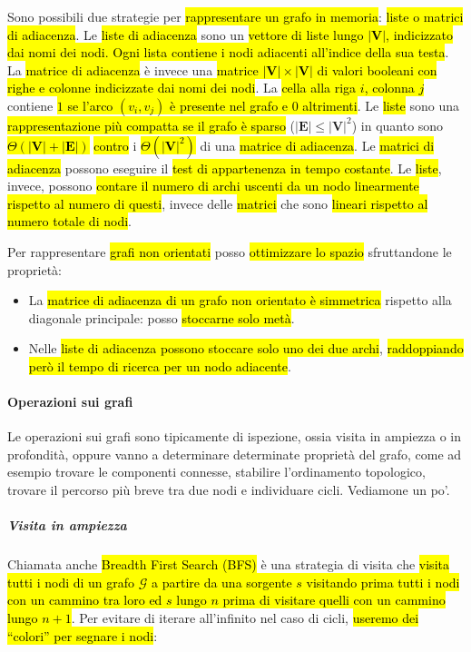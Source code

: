 \documentclass[a4paper,11pt,twoside]{article}
\theoremstyle{plain}
\theoremstyle{definition}
\theoremstyle{remark}
\begin{document}
Sono possibili due strategie per \hl{rappresentare un grafo in memoria}:
\hl{liste o matrici di adiacenza}. Le \hl{liste di adiacenza} sono un
\hl{vettore di liste lungo $|\mathbf{V}|$, indicizzato dai nomi dei nodi. Ogni
lista contiene i nodi adiacenti all'indice della sua testa}. La \hl{matrice di
adiacenza} è invece una \hl{matrice $|\mathbf{V}| \times |\mathbf{V}|$ di valori
booleani con righe e colonne indicizzate dai nomi dei nodi}. La \hl{cella alla
riga $i$, colonna $j$} contiene \hl{$1$ se l'arco $(v_i, v_j)$ è presente nel
grafo e $0$ altrimenti}. Le \hl{liste} sono una \hl{rappresentazione più
compatta se il grafo è sparso} ($|\mathbf{E}| \leq {|\mathbf{V}|}^2$) in quanto
sono \hl{$\Theta(|\mathbf{V}| + |\mathbf{E}|)$} \hl{contro} i
\hl{$\Theta({|\mathbf{V}|}^2)$} di una \hl{matrice di adiacenza}. Le \hl{matrici
di adiacenza} possono eseguire il \hl{test di appartenenza in tempo costante}.
Le \hl{liste}, invece, possono \hl{contare il numero di archi uscenti da un nodo
linearmente rispetto al numero di questi}, invece delle \hl{matrici} che sono
\hl{lineari rispetto al numero totale di nodi}.

Per rappresentare \hl{grafi non orientati} posso \hl{ottimizzare lo spazio}
sfruttandone le proprietà:

\begin{itemize}
  \item La \hl{matrice di adiacenza di un grafo non orientato è simmetrica}
    rispetto alla diagonale principale: posso \hl{stoccarne solo metà}.
  \item Nelle \hl{liste di adiacenza possono stoccare solo uno dei due archi},
    \hl{raddoppiando però il tempo di ricerca per un nodo adiacente}.
\end{itemize}

\paragraph{Operazioni sui grafi} Le operazioni sui grafi sono tipicamente di
ispezione, ossia visita in ampiezza o in profondità, oppure vanno a determinare
determinate proprietà del grafo, come ad esempio trovare le componenti connesse,
stabilire l'ordinamento topologico, trovare il percorso più breve tra due nodi e
individuare cicli. Vediamone un po'.

\subparagraph{Visita in ampiezza} Chiamata anche \hl{Breadth First Search (BFS)} è
una strategia di visita che \hl{visita tutti i nodi di un grafo $\mathcal{G}$ a
partire da una sorgente $s$ visitando prima tutti i nodi con un cammino tra loro
ed $s$ lungo $n$ prima di visitare quelli con un cammino lungo $n+1$}. Per
evitare di iterare all'infinito nel caso di cicli, \hl{useremo dei ``colori'' per
segnare i nodi}:
\end{document}
